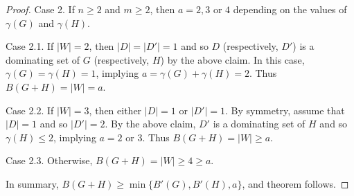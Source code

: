 \documentclass[10pt,a4paper]{amsart}
\begin{document}
\begin{proof}
Case 2.
If $n\geq 2$ and $m\ge 2$,
then $a=2,3$ or $4$ depending on the values of $\gamma(G)$ and $\gamma(H)$.

Case 2.1.
If $|W|=2$, then $|D|=|D'|=1$ and so $D$ (respectively, $D'$) is a dominating set of $G$ (respectively, $H$) by the above claim.
In this case, $\gamma(G)=\gamma(H)=1$, implying $a=\gamma(G)+\gamma(H)=2$.
Thus $ B(G+H) = |W|=a$.

Case 2.2.
If $|W|=3$, then either $|D|=1$ or $|D'|=1$.
By symmetry, assume that $|D|=1$ and so $|D'|=2$.
By the above claim, $D'$ is a dominating set of $H$
and so $\gamma(H)\le 2$, implying $a=2$ or $3$.
Thus $B(G+H) = |W|\ge a$.

Case 2.3.
Otherwise, $B(G+H) = |W|\ge 4\ge a$.
 
In summary, $B(G+H)\ge \min\{B'(G),B'(H),a\}$,
and theorem follows.
\end{proof}
\end{document}
